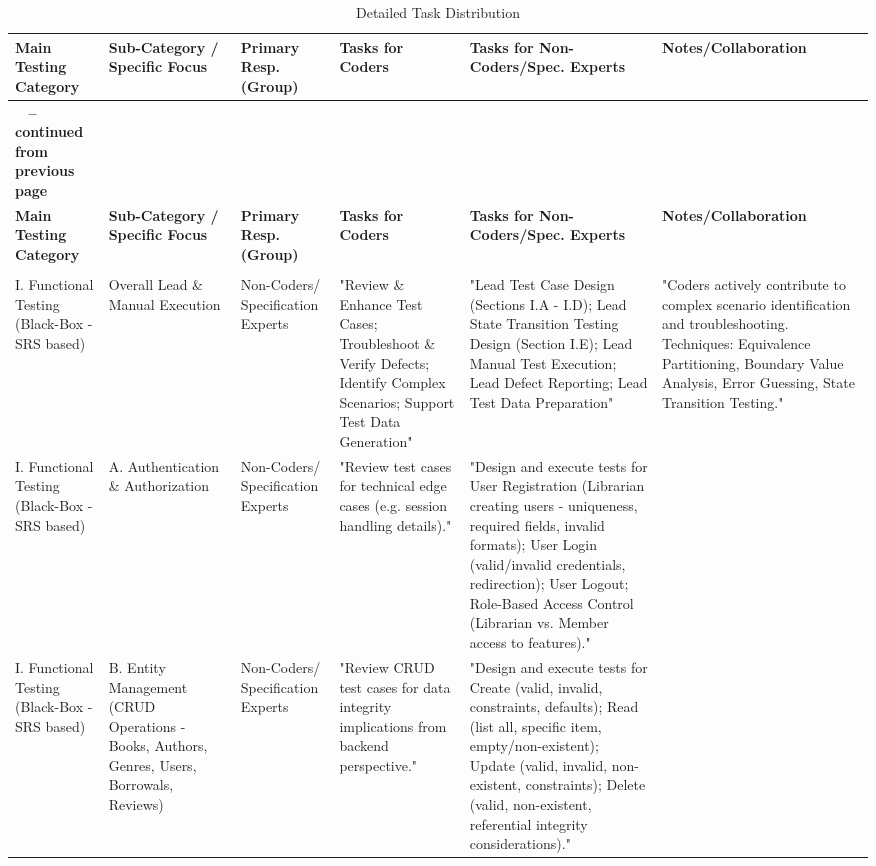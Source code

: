 \documentclass[12pt, a4paper]{article}
\begin{document}
\tiny %
\begin{longtable}{|>{\scriptsize\raggedright\arraybackslash}p{2.5cm}|>{\raggedright\arraybackslash}p{3.5cm}|>{\raggedright\arraybackslash}p{2.5cm}|>{\raggedright\arraybackslash}p{6cm}|>{\raggedright\arraybackslash}p{6cm}|>{\raggedright\arraybackslash}p{5.2cm}|}
\caption{Detailed Task Distribution}\label{tab:task_details}\\
\hline
\textbf{Main Testing Category} & \textbf{Sub-Category / Specific Focus} & \textbf{Primary Resp. (Group)} & \textbf{Tasks for Coders} & \textbf{Tasks for Non-Coders/Spec. Experts} & \textbf{Notes/Collaboration} \\
\hline
\endfirsthead
\multicolumn{6}{c}%
{{\bfseries \tablename\ \thetable{} -- continued from previous page}} \\
\hline
\textbf{Main Testing Category} & \textbf{Sub-Category / Specific Focus} & \textbf{Primary Resp. (Group)} & \textbf{Tasks for Coders} & \textbf{Tasks for Non-Coders/Spec. Experts} & \textbf{Notes/Collaboration} \\
\hline
\endhead
\hline \multicolumn{6}{|r|}{{Continued on next page}} \\ \hline
\endfoot
\hline
\endlastfoot
I. Functional Testing (Black-Box - SRS based) & Overall Lead \& Manual Execution & Non-Coders/ Specification Experts & "Review \& Enhance Test Cases; Troubleshoot \& Verify Defects; Identify Complex Scenarios; Support Test Data Generation" & "Lead Test Case Design (Sections I.A - I.D); Lead State Transition Testing Design (Section I.E); Lead Manual Test Execution; Lead Defect Reporting; Lead Test Data Preparation" & "Coders actively contribute to complex scenario identification and troubleshooting. Techniques: Equivalence Partitioning, Boundary Value Analysis, Error Guessing, State Transition Testing." \\ \hline
I. Functional Testing (Black-Box - SRS based) & A. Authentication \& Authorization & Non-Coders/ Specification Experts & "Review test cases for technical edge cases (e.g. session handling details)." & "Design and execute tests for User Registration (Librarian creating users - uniqueness, required fields, invalid formats); User Login (valid/invalid credentials, redirection); User Logout; Role-Based Access Control (Librarian vs. Member access to features)." &  \\ \hline
I. Functional Testing (Black-Box - SRS based) & B. Entity Management (CRUD Operations - Books, Authors, Genres, Users, Borrowals, Reviews) & Non-Coders/ Specification Experts & "Review CRUD test cases for data integrity implications from backend perspective." & "Design and execute tests for Create (valid, invalid, constraints, defaults); Read (list all, specific item, empty/non-existent); Update (valid, invalid, non-existent, constraints); Delete (valid, non-existent, referential integrity considerations)." &  \\ \hline

\end{longtable}
\end{document}
